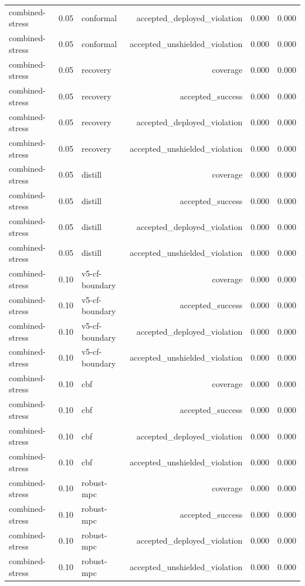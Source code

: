\documentclass{article}
\begin{document}
\begin{longtable}{@{}lllrrr@{}}
combined-stress & 0.05 & conformal & accepted\_deployed\_violation & 0.000 & 0.000 \\
combined-stress & 0.05 & conformal & accepted\_unshielded\_violation & 0.000 & 0.000 \\
combined-stress & 0.05 & recovery & coverage & 0.000 & 0.000 \\
combined-stress & 0.05 & recovery & accepted\_success & 0.000 & 0.000 \\
combined-stress & 0.05 & recovery & accepted\_deployed\_violation & 0.000 & 0.000 \\
combined-stress & 0.05 & recovery & accepted\_unshielded\_violation & 0.000 & 0.000 \\
combined-stress & 0.05 & distill & coverage & 0.000 & 0.000 \\
combined-stress & 0.05 & distill & accepted\_success & 0.000 & 0.000 \\
combined-stress & 0.05 & distill & accepted\_deployed\_violation & 0.000 & 0.000 \\
combined-stress & 0.05 & distill & accepted\_unshielded\_violation & 0.000 & 0.000 \\
combined-stress & 0.10 & v5-cf-boundary & coverage & 0.000 & 0.000 \\
combined-stress & 0.10 & v5-cf-boundary & accepted\_success & 0.000 & 0.000 \\
combined-stress & 0.10 & v5-cf-boundary & accepted\_deployed\_violation & 0.000 & 0.000 \\
combined-stress & 0.10 & v5-cf-boundary & accepted\_unshielded\_violation & 0.000 & 0.000 \\
combined-stress & 0.10 & cbf & coverage & 0.000 & 0.000 \\
combined-stress & 0.10 & cbf & accepted\_success & 0.000 & 0.000 \\
combined-stress & 0.10 & cbf & accepted\_deployed\_violation & 0.000 & 0.000 \\
combined-stress & 0.10 & cbf & accepted\_unshielded\_violation & 0.000 & 0.000 \\
combined-stress & 0.10 & robust-mpc & coverage & 0.000 & 0.000 \\
combined-stress & 0.10 & robust-mpc & accepted\_success & 0.000 & 0.000 \\
combined-stress & 0.10 & robust-mpc & accepted\_deployed\_violation & 0.000 & 0.000 \\
combined-stress & 0.10 & robust-mpc & accepted\_unshielded\_violation & 0.000 & 0.000 \\

\end{longtable}
\end{document}
